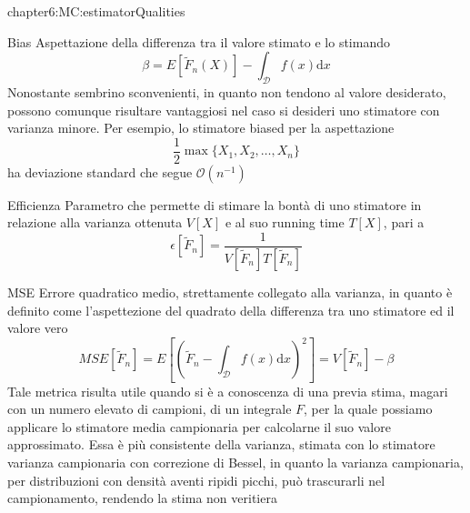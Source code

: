 \begin{altDescription}{chapter6:MC:estimatorQualities}
	\item[Bias] Aspettazione della differenza tra il valore stimato e lo stimando
		\begin{equation}
			\beta = E[\tilde{F}_n(X)]-\int_{\mathcal{D}}f(x)\mathrm{d}x
		\end{equation}
		Nonostante sembrino sconvenienti, in quanto non tendono al valore desiderato, possono comunque risultare vantaggiosi nel caso si desideri uno
		stimatore con varianza minore. Per esempio, lo stimatore biased per la aspettazione
		\begin{equation}
			\frac{1}{2}\max\{X_1,X_2,\ldots,X_n\}
		\end{equation}
		ha deviazione standard che segue \mbox{$\mathcal{O}\left(n^{-1}\right)$}
	\item[Efficienza] Parametro che permette di stimare la bont\`a di uno stimatore in relazione alla varianza ottenuta $V[X]$ e al suo running time
		$T[X]$, pari a 
		\begin{equation}\label{chapter6:MC:efficiency}
			\epsilon[\tilde{F}_n]=\frac{1}{V[\tilde{F}_n]T[\tilde{F}_n]}
		\end{equation}
	\item[MSE] Errore quadratico medio, strettamente collegato alla varianza, in quanto \`e definito come l'aspettezione del quadrato della 
		differenza tra uno stimatore ed il valore vero
		\begin{equation}
			MSE[\tilde{F}_n]=E\left[\left(\tilde{F}_n-\int_{\mathcal{D}}f(x)\mathrm{d}x\right)^2\right]=V[\tilde{F}_n]-\beta
		\end{equation}
		Tale metrica risulta utile quando si \`e a conoscenza di una previa stima, magari con un numero elevato di campioni, di un integrale $F$,
		per la quale possiamo applicare lo stimatore media campionaria per calcolarne il suo valore approssimato. Essa \`e pi\`u consistente della 
		varianza, stimata con lo stimatore varianza campionaria con correzione di Bessel, in quanto la varianza campionaria, per distribuzioni con 
		densit\`a aventi ripidi picchi, pu\`o trascurarli nel campionamento, rendendo la stima non veritiera
\end{altDescription}
